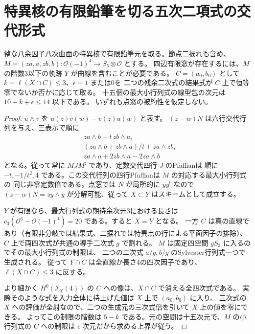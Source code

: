 \section{特異核の有限鉛筆を切る五次二項式の交代形式}
\label{sec:singular-quintic-pfaffians}
\begin{theorem}\label{thm:singular-quintic-pfaffians}
整な八余因子八次曲面の特異核で有限鉛筆元を取る。節点二捩れも含め、
$M=(za,a,zb,b):\mathcal O(-1)^4\to S_5\otimes\mathcal O$ とする。
四辺有限窓が存在するには、$M$ の階数3以下の軌跡 $Y$ が曲線を含むことが必要である。
$C=(a_0,b_0)$ として $k=\ell(X\cap C)\le3$、$\epsilon=1$ または0を
二つの残余二次式の結果式が $C$ 上で恒等零でないか否かに応じて取る。
十五個の最大小行列式の線型包の次元は $10+k+\epsilon\le14$ 以下である。
いずれも点窓の被約性を仮定しない。
\end{theorem}
\begin{proof}
$u\wedge v$ を $u(z)v(w)-v(z)u(w)$ と表す。
$(z-w)N$ は六行交代行列を与え、三表示で順に
\begin{align*}
 &za\wedge b+t\,zb\wedge a,\\
 &(za\wedge b+zb\wedge a)/t+za\wedge zb,\\
 &za\wedge a+2zb\wedge a-2za\wedge b
\end{align*}
となる。従って常に $MJM^{\mathsf t}$ であり、定数交代四行 $J$ のPfaffianは
順に $-t,-1/t^2,4$ である。この交代行列の四行Pfaffianは $M$ の対応する最大小行列式の
同じ非零定数倍である。点窓では $N$ が局所的に $yy^{\mathsf t}$ なので
$(z-w)N=zy\wedge y$ が分解可能、従って $X\subset Y$ はスキームとして成立する。

$Y$ が有限なら、最大行列式の期待余次元3における長さは
$c_3(\mathcal O^6-\mathcal O(-1)^4)=20$ である。すると $X=Y$ となる。
一方 $C$ は真の直線であり（有限非分岐では結果式、二捩れでは特異点の行による平面因子の排除）、
$C$ 上で両四次式が共通の導手二次式 $g$ で割れる。
$M$ は固定四空間 $gS_3$ に入るのでその最大小行列式の制限は、
二つの二次式 $a/g,b/g$ のSylvester行列式一つで生成される。
従って $Y\cap C$ は全直線か長さ4の四次因子であり、$\ell(X\cap C)\le3$ に反する。

より細かく $H^0(\mathcal I_X(4))$ の $C$ への像は、$X\cap C$ で消える全四次式である。
実際そのような式を入力全体に持上げた値は $X$ 上で $(a_0,b_0)$ に入り、
三次式の $X$ への評価が全射なので、二つの生成元の三次式倍を引いて $X$ 上の値を零にできる。
よってこの制限の階数は $5-k$ である。元の空間は十五次元で、$M$ の小行列式の
$C$ への制限は $\epsilon$ 次元だから求める上界が従う。
\end{proof}

